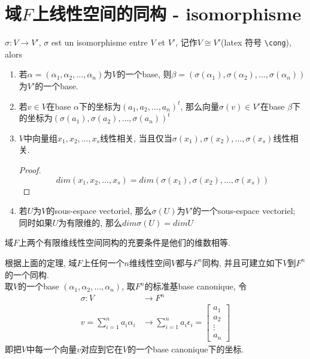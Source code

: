 \section{域$F$上线性空间的同构 - isomorphisme}
$\sigma: V \rightarrow V'$, $\sigma$ est un isomorphisme entre $V$ et $V'$, 记作$V \cong V'$(latex 符号 \verb+\cong+), alors
\begin{enumerate}
\item 若$\alpha = (\alpha_1, \alpha_2, \ldots, \alpha_n)$为$V$的一个base, 则$\beta = (\sigma(\alpha_1), \sigma(\alpha_2), \ldots, \sigma(\alpha_n))$为$V'$的一个base.
\item 若$v \in V$在base $\alpha$下的坐标为$(a_1, a_2, \ldots, a_n)^t$,
	那么向量$\sigma(v) \in V'$在base $\beta$下的坐标为$(\sigma(a_1), \sigma(a_2), \ldots, \sigma(a_n))^t$
\item $V$中向量组$x_1, x_2, \ldots, x_s$线性相关, 当且仅当$\sigma(x_1), \sigma(x_2), \ldots, \sigma(x_s)$线性相关.
	\begin{proof}
	$$dim(x_1, x_2, \ldots, x_s) = dim(\sigma(x_1), \sigma(x_2), \ldots, \sigma(x_s))$$
	\end{proof}
\item 若$U$为$V$的sous-espace vectoriel, 那么$\sigma(U)$为$V'$的一个sous-espace vectoriel;
		同时如果$U$为有限维的, 那么$dim \sigma(U) = dim U$
\end{enumerate}

\begin{theorem}[维数决定同构]
域$F$上两个有限维线性空间同构的充要条件是他们的维数相等.
\end{theorem}
根据上面的定理, 域$F$上任何一个$n$维线性空间$V$都与$F^n$同构, 并且可建立如下$V$到$F^n$的一个同构.\\
取$V$的一个base $(\alpha_1, \alpha_2, \ldots, \alpha_n)$, 取$F^n$的标准基base canonique, 令
$$
\begin{aligned}
\sigma: V & \rightarrow F^n \\
v = \sum_{i = 1}^n a_i \alpha_i & \rightarrow \sum_{i = 1}^n a_i \epsilon_i = \begin{bmatrix}a_1 \\ a_2 \\ \vdots \\ a_n \end{bmatrix}
\end{aligned}
$$
即把$V$中每一个向量$v$对应到它在$V$的一个base canonique下的坐标.

